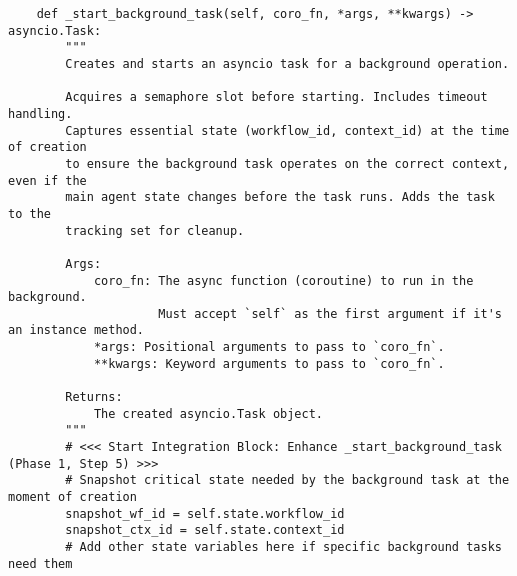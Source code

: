 \documentclass[12pt,a4paper]{article}
\begin{document}
\begin{pageablecode}
\begin{verbatim}
    def _start_background_task(self, coro_fn, *args, **kwargs) -> asyncio.Task:
        """
        Creates and starts an asyncio task for a background operation.

        Acquires a semaphore slot before starting. Includes timeout handling.
        Captures essential state (workflow_id, context_id) at the time of creation
        to ensure the background task operates on the correct context, even if the
        main agent state changes before the task runs. Adds the task to the
        tracking set for cleanup.

        Args:
            coro_fn: The async function (coroutine) to run in the background.
                     Must accept `self` as the first argument if it's an instance method.
            *args: Positional arguments to pass to `coro_fn`.
            **kwargs: Keyword arguments to pass to `coro_fn`.

        Returns:
            The created asyncio.Task object.
        """
        # <<< Start Integration Block: Enhance _start_background_task (Phase 1, Step 5) >>>
        # Snapshot critical state needed by the background task at the moment of creation
        snapshot_wf_id = self.state.workflow_id
        snapshot_ctx_id = self.state.context_id
        # Add other state variables here if specific background tasks need them


\end{verbatim}
\end{pageablecode}
\end{document}
